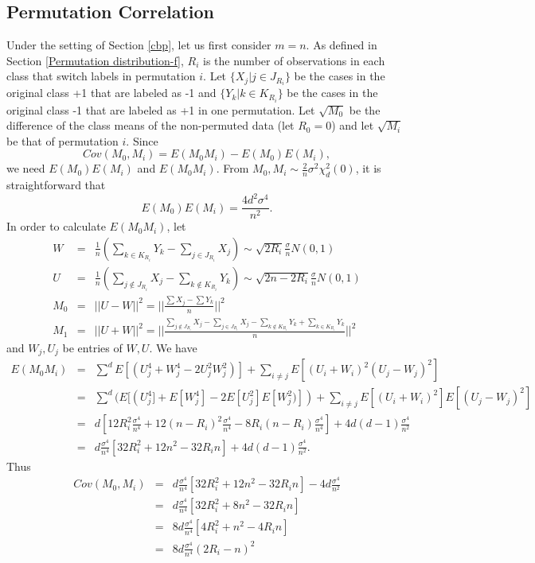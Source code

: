 \documentclass[12pt]{article}
\begin{document}
\begin{appendices}
\section{Permutation Correlation}
\label{a5}
Under the setting of Section \ref{cbp}, let us first consider $m=n$. As defined in Section \ref{Permutation distribution-f}, $R_i$ is the number of observations in each class that switch labels in permutation $i$. Let $\{X_{j}| j\in J_{R_i}\}$ be the cases in the original class +1 that are labeled as -1 and $\{Y_{k}| k\in K_{R_i}\}$ be the cases in the original class -1 that are labeled as +1 in one permutation.  Let $\sqrt{M_0}$ be the difference of the class means of the non-permuted data (let $R_0=0$) and let $\sqrt{M_i}$ be that of permutation $i$. Since 
$$Cov(M_0,M_i)=E(M_0M_i)-E(M_0)E(M_i),$$
we need $E(M_0)E(M_i)$ and $E(M_0M_i)$. From $M_0, M_i\sim \frac{2}{n}\sigma^2\chi^2_d(0)$, it is straightforward that 
$$E(M_0)E(M_i)=\frac{4d^2\sigma^4}{n^2}.$$
In order to calculate $E(M_0M_i)$, let
\begin{eqnarray*}
W&=&\frac{1}{n}(\sum_{k\in K_{R_i}}Y_k-\sum_{j\in J_{R_i}}X_j)\sim \sqrt{2R_i}\frac{\sigma}{n} N(0, 1)\\
U&=&\frac{1}{n}(\sum_{j\notin J_{R_i}}X_j-\sum_{k\notin K_{R_i}}Y_k)\sim \sqrt{2n-2R_i}\frac{\sigma}{n}N(0, 1)\\
M_0&=&||U-W||^2=||\frac{\sum X_j-\sum Y_k}{n}||^2\\
M_1&=&||U+W||^2=||\frac{\sum_{j \notin J_{R_i}} X_j-\sum_{j \in J_{R_i}} X_j-\sum_{k \notin K_{R_i}}Y_k+\sum_{k \in K_{R_i}}Y_k}{n}||^2
\end{eqnarray*}
and $W_j, U_j$ be entries of $W, U$. We have
\begin{eqnarray*}
E(M_0M_i)&=&\sum^d E[(U_j^4+W_j^4-2U_j^2W_j^2)]+\sum_{i\ne j}E[(U_i+W_i)^2(U_j-W_j)^2]\\
&=&\sum^d (E[(U_j^4]+E[W_j^4]-2E[U_j^2]E[W_j^2)])+\sum_{i\ne j}E[(U_i+W_i)^2]E[(U_j-W_j)^2]\\
&=&d[12R_i^2\frac{\sigma^4}{n^4}+12(n-R_i)^2\frac{\sigma^4}{n^4}-8R_i(n-R_i)\frac{\sigma^4}{n^4}]+4d(d-1)\frac{\sigma^4}{n^2}\\
&=&d\frac{\sigma^4}{n^4}[32R_i^2+12n^2-32R_in]+4d(d-1)\frac{\sigma^4}{n^2}.
\end{eqnarray*}
Thus
\begin{eqnarray*}
Cov(M_0, M_i)&=&d\frac{\sigma^4}{n^4}[32R_i^2+12n^2-32R_in]-4d\frac{\sigma^4}{n^2}\\
&=&d\frac{\sigma^4}{n^4}[32R_i^2+8n^2-32R_in]\\
&=&8d\frac{\sigma^4}{n^4}[4R_i^2+n^2-4R_in]\\
&=&8d\frac{\sigma^4}{n^4}(2R_i-n)^2
\end{eqnarray*}


\end{appendices}
\end{document}
